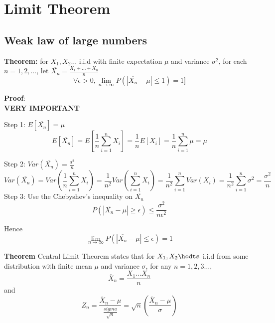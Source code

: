\section{Limit Theorem}

\subsection{Weak law of large numbers}
\begin{framed}
\textbf{Theorem:} for $X_1, X_2 \hdots$ i.i.d with finite expectation $\mu$ and variance $\sigma^2$, for each $n = 1, 2,  \hdots$,  let $ \overline{X_n} = \frac{X_1 + \hdots + X_n }{n}$ 
\[
   \forall \epsilon > 0, \lim_{n \to \infty} P( |\overline{X_n} - \mu| 
\leq 1) = 1] 
\] 

\textbf{Proof}: \\

\color{red} 
\textbf{VERY IMPORTANT}
\color{black} 

Step 1: $E[ \overline{X_n} ] = \mu$ 
\[
   E\left[ \overline{X_n} \right]  = E\left[ \frac{1}{n} \sum_{i = 1}^{n} X_i\right]  = \frac{1}{n} E\left[ X_i\right]  = \frac{1}{n} \sum_{i = 1}^{n} \mu = \mu
\]  


Step 2: $Var( \overline{X_n} ) = \frac{\sigma^2}{n}$ 
\[
   Var \left( \overline{X_n} \right)  = Var \left(  \frac{1}{n} \sum_{i = 1}^{n} X_i \right)  = \frac{1}{n^2} Var \left(  \sum_{ i = 1}^{n} X_i \right)  = \frac{1}{n^2} \sum_{i = 1}^{n} Var(X_i)  = \frac{1}{n^2} \sum_{i = 1}^{n} \sigma^2 = \frac{\sigma^2}{n}
\] 
Step 3: Use the Chebyshev's inequality on $ \overline{X_n}$ 
\[
  P \left( \left| \overline{X_n} - \mu \right| \geq \epsilon  \right)  \leq \frac{\sigma^2}{ n \epsilon^2}
\] 

Hence 
\[
   \lim_{n \to \infty} P \left( \left| \overline{X_n} - \mu \right|  \leq \epsilon  \right)  = 1
\] 
\end{framed}

\begin{framed}
   \textbf{Theorem} Central Limit Theorem states that for $X_1, X_2 \hodts$ i.i.d from some distribution with finite mean $\mu$ and variance  $\sigma$, for any $n = 1, 2, 3 \hdots$, 
   \[
      \overline{X}_n = \frac{X_1 \hdots X_n}{n} 
   \] 
   and 
   \[
     Z_n = \frac{\overline{X}_n - \mu}{ \frac{sigma}{ \sqrt{n}}} = \sqrt{n} \left( \frac{\overline{X}_n  - \mu}{\sigma} \right) 
   \] 
\end{framed}

  

